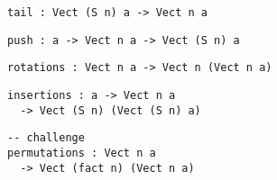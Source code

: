 \begin{frame}[fragile]

\begin{lstlisting}[frame=single]
tail : Vect (S n) a -> Vect n a
\end{lstlisting}
\begin{lstlisting}[frame=single]
push : a -> Vect n a -> Vect (S n) a
\end{lstlisting}
\begin{lstlisting}[frame=single]
rotations : Vect n a -> Vect n (Vect n a)
\end{lstlisting}
\begin{lstlisting}[frame=single]
insertions : a -> Vect n a
  -> Vect (S n) (Vect (S n) a)
\end{lstlisting}
\begin{lstlisting}[frame=single]
-- challenge
permutations : Vect n a
  -> Vect (fact n) (Vect n a)
\end{lstlisting}

\end{frame}
